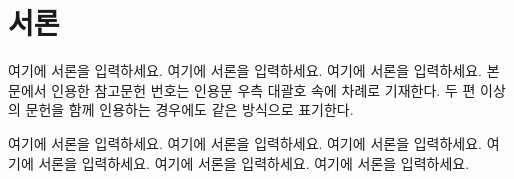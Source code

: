 \section{서\hspace{0.5em}론}

여기에 서론을 입력하세요. 여기에 서론을 입력하세요. 여기에 서론을 입력하세요.
본문에서 인용한 참고문헌 번호는 인용문 우측 대괄호 속에 차례로
기재한다\cite{song2010opc}. 두 편 이상의 문헌을 함께 인용하는 경우에도 같은
방식으로 표기한다\cite{song2010opc,goeckel1999fading}.

여기에 서론을 입력하세요. 여기에 서론을 입력하세요. 여기에 서론을 입력하세요.
여기에 서론을 입력하세요. 여기에 서론을 입력하세요. 여기에 서론을 입력하세요.
